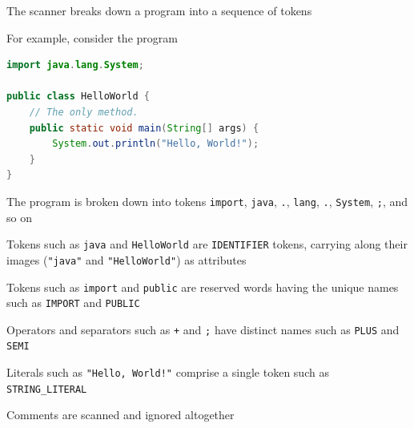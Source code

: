\documentclass[8pt,a4paper,compress]{beamer}
\begin{document}
\begin{frame}[fragile]
\pause\transdissolve

The scanner breaks down a \jmm program into a sequence of tokens

\pause\transdissolve\bigskip

For example, consider the program

\pause\transdissolve\smallskip

\begin{tcolorbox}[enhanced,drop shadow southwest,sharp corners,size=fbox,colback=white,fontlower=\small\ttfamily,collower=silver100]

\begin{lstlisting}[language=Java,style=focusin]
import java.lang.System;

public class HelloWorld {
    // The only method.
    public static void main(String[] args) {
        System.out.println("Hello, World!");
    }
}
\end{lstlisting}
\end{tcolorbox}

\pause\transdissolve\smallskip

The program is broken down into tokens \lstinline{import}, \lstinline{java}, \lstinline{.}, \lstinline{lang}, \lstinline{.}, \lstinline{System}, \lstinline{;}, and so on

\pause\transdissolve\bigskip

Tokens such as \lstinline{java} and \lstinline{HelloWorld} are \lstinline{IDENTIFIER} tokens, carrying along their images (\lstinline{"java"} and \lstinline{"HelloWorld"}) as attributes

\pause\transdissolve\bigskip

Tokens such as \lstinline{import} and \lstinline{public} are reserved words having the unique names such as \lstinline{IMPORT} and \lstinline{PUBLIC}

\pause\transdissolve\bigskip

Operators and separators such as \lstinline{+} and \lstinline{;} have distinct names such as \lstinline{PLUS} and \lstinline{SEMI}

\pause\transdissolve\bigskip

Literals such as \lstinline{"Hello, World!"} comprise a single token such as \lstinline{STRING_LITERAL}

\pause\transdissolve\bigskip

Comments are scanned and ignored altogether
\end{frame}
\end{document}
